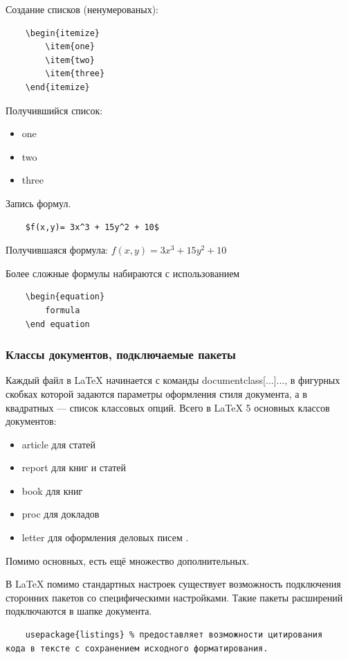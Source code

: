 \documentclass[a4paper, 14pt]{article}				%
\begin{document}
Создание списков (ненумерованых):
\begin{verbatim}
	\begin{itemize}
		\item{one}
		\item{two}
		\item{three}
	\end{itemize}
\end{verbatim}

Получившийся список:
\begin{itemize}
	\item{one}
	\item{two}
	\item{three}
\end{itemize}

Запись формул. 
\begin{verbatim}
	$f(x,y)= 3x^3 + 15y^2 + 10$
\end{verbatim}

Получившаяся формула:
$f(x,y)= 3x^3 + 15y^2 + 10$

Более сложные формулы набираются с использованием 
\begin{verbatim}
	\begin{equation}
		formula
	\end equation
\end{verbatim}

\subsubsection{Классы документов, подключаемые пакеты}
Каждый файл в \LaTeX{} начинается с команды documentclass[...]{...}, в фигурных скобках которой задаются параметры оформления стиля документа, а в квадратных — список классовых опций.
Всего в \LaTeX{} 5 основных классов документов:
\begin{itemize}
\item {article для статей}
\item {report для книг и статей}
\item {book для книг}
\item {proc для докладов}
\item {letter для оформления деловых писем} . 
\end{itemize} 
Помимо основных, есть ещё множество дополнительных.

В \LaTeX{} помимо стандартных настроек существует возможность подключения сторонних пакетов со специфическими настройками. Такие пакеты расширений подключаются в шапке документа.
\begin{verbatim}
	usepackage{listings} % предоставляет возможности цитирования 
кода в тексте с сохранением исходного форматирования.
\end{verbatim}
\end{document}
